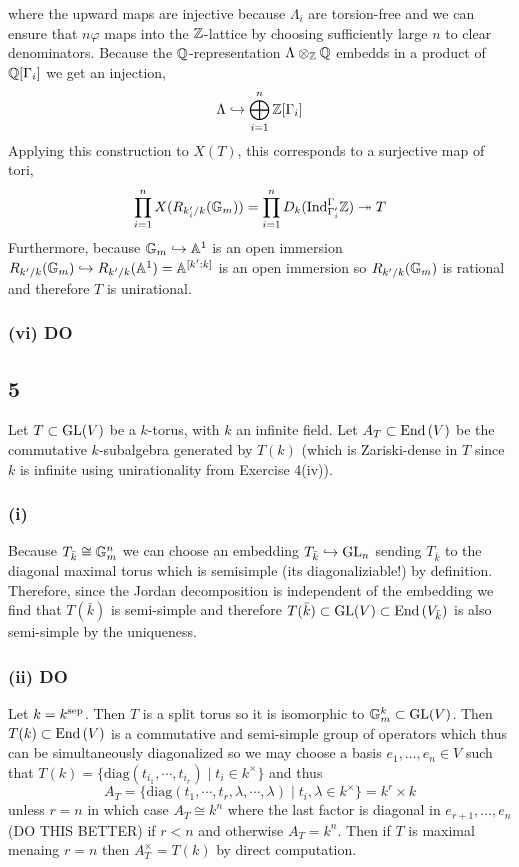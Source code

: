 \documentclass[12pt]{article}
\begin{document}
where the upward maps are injective because $\Lambda_i$ are torsion-free and we can ensure that $n \varphi$ maps into the $\mathbb{Z}$-lattice by choosing sufficiently large $n$ to clear denominators. Because the $\mathbb{Q}$-representation $\Lambda \otimes_{\mathbb{Z}} \mathbb{Q}$ embedds in a product of $\mathbb{Q}[\Gamma_i]$ we get an injection,
\[ \Lambda \hookrightarrow \bigoplus_{i = 1}^n \mathbb{Z}[\Gamma_i] \]
Applying this construction to $X(T)$, this corresponds to a surjective map of tori,
\[ \prod_{i = 1}^n X(R_{k_i'/k} (\mathbb{G}_m)) = \prod_{i = 1}^n D_k(\mathrm{Ind}^{\Gamma}_{\Gamma_i'} \mathbb{Z})\twoheadrightarrow T \] 
Furthermore, because $\mathbb{G}_m \hookrightarrow \mathbb{A}^1$ is an open immersion $R_{k'/k}(\mathbb{G}_m) \hookrightarrow R_{k'/k}(\mathbb{A}^1) = \mathbb{A}^{[k' : k]}$ is an open immersion so $R_{k'/k}(\mathbb{G}_m)$ is rational and therefore $T$ is unirational.

\subsubsection{(vi) DO}

\subsection{5}

Let $T \subset \mathrm{GL}(V)$ be a $k$-torus, with $k$ an infinite field. Let $A_T \subset \mathrm{End}\left( V \right)$ be the commutative $k$-subalgebra generated by $T(k)$ (which is Zariski-dense in $T$ since $k$ is infinite using unirationality from Exercise 4(iv)).

\subsubsection{(i)}

Because $T_{\bar{k}} \cong \mathbb{G}_m^n$ we can choose an embedding $T_{\bar{k}} \hookrightarrow \mathrm{GL}_{n}$ sending $T_{\bar{k}}$ to the diagonal maximal torus which is semisimple (its diagonaliziable!) by definition. Therefore, since the Jordan decomposition is independent of the embedding we find that $T(\bar{k})$ is semi-simple and therefore $T(\bar{k}) \subset \mathrm{GL}(V) \subset \mathrm{End}\left( V_{\bar{k}} \right)$ is also semi-simple by the uniqueness.

\subsubsection{(ii) DO}

Let $k = k^{\mathrm{sep}}$. Then $T$ is a split torus so it is isomorphic to $\mathbb{G}_m^k \subset \mathrm{GL}(V)$. Then $T(k) \subset \mathrm{End}\left( V \right)$ is a commutative and semi-simple group of operators which thus can be simultaneously diagonalized so we may choose a basis $e_1, \dots, e_n \in V$ such that $T(k) = \{ \mathrm{diag}(t_{i_1}, \cdots, t_{i_r}) \mid t_i \in k^\times \}$ and thus
\[ A_T = \{ \mathrm{diag}(t_1, \cdots, t_r, \lambda, \cdots, \lambda) \mid t_i, \lambda \in k^\times \} = k^r \times k \]
unless $r = n$ in which case $A_T \cong k^n$ where the last factor is diagonal in $e_{r+1}, \dots, e_n$ (DO THIS BETTER) if $r < n$ and otherwise $A_T = k^n$. Then if $T$ is maximal menaing $r = n$ then $A_T^\times = T(k)$ by direct computation.
\end{document}
